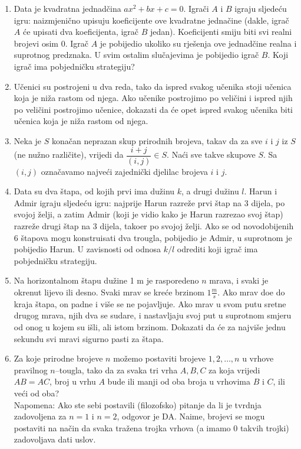 \documentclass{article}
\begin{document}
\begin{enumerate}
    \item Data je kvadratna jednad\v{c}ina $ax^2 + bx + c = 0$. Igra\v{c}i $A$ i $B$ igraju sljede\'cu igru: naizmjeni\v{c}no upisuju koeficijente ove kvadratne jedna\v{c}ine (dakle, igra\v{c} $A$ \'ce upisati dva koeficijenta, igra\v{c} $B$ jedan). Koeficijenti smiju biti svi realni brojevi osim 0. Igra\v{c} $A$ je pobijedio ukoliko su rje\v{s}enja ove jednad\v{c}ine realna i suprotnog predznaka. U svim ostalim slu\v{c}ajevima je pobijedio igra\v{c} $B$. Koji igra\v{c} ima pobjedni\v{c}ku strategiju?

    \item U\v{c}enici su postrojeni u dva reda, tako da ispred svakog u\v{c}enika stoji u\v{c}enica koja je ni\v{z}a rastom od njega. Ako u\v{c}enike postrojimo po veli\v{c}ini i ispred njih po veli\v{c}ini postrojimo u\v{c}enice, dokazati da \'ce opet ispred svakog u\v{c}enika biti u\v{c}enica koja je ni\v{z}a rastom od njega.

    \item Neka je $S$ kona\v{c}an neprazan skup prirodnih brojeva, takav da za sve $i$ i $j$ iz $S$ (ne nu\v{z}no razli\v{c}ite), vrijedi da $\dfrac{i+j}{(i,j)} \in S$. Na\'ci sve takve skupove $S$. Sa $(i,j)$ ozna\v{c}avamo najve\'ci zajedni\v{c}ki djelilac brojeva $i$ i $j$.

    \item Data su dva \v{s}tapa, od kojih prvi ima du\v{z}inu $k$, a drugi du\v{z}inu $l$. Harun i Admir igraju sljede\'cu igru: najprije Harun razre\v{z}e prvi \v{s}tap na 3 dijela, po svojoj \v{z}elji, a zatim Admir (koji je vidio kako je Harun razrezao svoj \v{s}tap) razre\v{z}e drugi \v{s}tap na 3 dijela, tako\dj er po svojoj \v{z}elji. Ako se od novodobijenih 6 \v{s}tapova mogu konstruisati dva trougla, pobijedio je Admir, u suprotnom je pobijedio Harun. U zavisnosti od odnosa $k/l$ odrediti koji igra\v{c} ima pobjedni\v{c}ku strategiju.

    \item Na horizontalnom \v{s}tapu du\v{z}ine 1 m je rasporedeno $n$ mrava, i svaki je okrenut lijevo ili desno. Svaki mrav se kre\'ce brzinom $1\frac{m}{s}$. Ako mrav do\dj e do kraja \v{s}tapa, on padne i vi\v{s}e se ne pojavljuje. Ako mrav u svom putu sretne drugog mrava, njih dva se sudare, i nastavljaju svoj put u suprotnom smjeru od onog u kojem su i\v{s}li, ali istom brzinom. Dokazati da \'ce za najvi\v{s}e jednu sekundu svi mravi sigurno pasti za \v{s}tapa.

    \item Za koje prirodne brojeve $n$ mo\v{z}emo postaviti brojeve $1, 2, \ldots, n$ u vrhove pravilnog $n$--tougla, tako da za svaka tri vrha $A, B, C$ za koja vrijedi $AB = AC$, broj u vrhu $A$ bude ili manji od oba broja u vrhovima $B$ i $C$, ili ve\'ci od oba?\\
    Napomena: Ako ste sebi postavili (filozofsko) pitanje da li je tvrdnja zadovoljena za $n = 1$ i $n = 2$, odgovor je DA. Naime, brojevi se mogu postaviti na na\v{c}in da svaka tra\v{z}ena trojka vrhova (a imamo 0 takvih trojki) zadovoljava dati uslov.


\end{enumerate}
\end{document}
